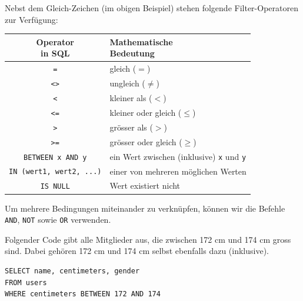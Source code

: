 Nebst dem Gleich-Zeichen (im obigen Beispiel) stehen folgende Filter-Operatoren zur Verfügung:
\begin{table}[H]
  \centering
  \begin{tabular}{c|l}
    \makecell{\textbf{Operator}                                                                 \\\textbf{in \gls{SQL}}} & \makecell{\textbf{Mathematische}\\\textbf{Bedeutung}} \\\midrule
    \texttt{=}                                    & gleich ($=$)                                \\
    \texttt{<>}                                   & ungleich ($\neq$)                           \\
    \texttt{<}                                    & kleiner als ($<$)                           \\
    \texttt{<=}                                   & kleiner oder gleich ($\leq$)                \\
    \texttt{>}                                    & grösser als ($>$)                           \\
    \texttt{>=}                                   & grösser oder gleich ($\geq$)                \\
    \lstinline|BETWEEN x AND y|        & ein Wert zwischen (inklusive) \texttt{x} und \texttt{y} \\
    \lstinline|IN (wert1, wert2, ...)| & einer von mehreren möglichen Werten         \\
    \lstinline|IS NULL|                & Wert existiert nicht                        \\
  \end{tabular}
\end{table}
Um mehrere Bedingungen miteinander zu verknüpfen, können wir die Befehle \lstinline|AND|, \lstinline|NOT| sowie \lstinline|OR| verwenden.

\begin{myexample}\label{myexample:between}
Folgender Code gibt alle Mitglieder aus, die zwischen 172 cm und 174 cm gross sind. Dabei gehören 172 cm und 174 cm selbst ebenfalls dazu (inklusive).

\begin{lstlisting}
SELECT name, centimeters, gender
FROM users
WHERE centimeters BETWEEN 172 AND 174
\end{lstlisting}
\end{myexample}

